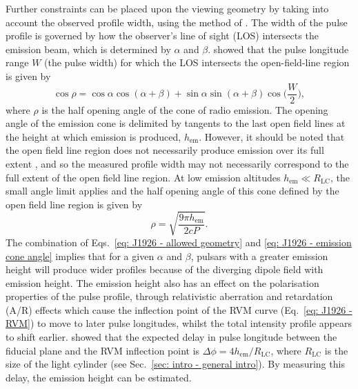 Further constraints can be placed upon the viewing geometry by taking into account the observed profile width, using the method of \citet{RWJx2015a}. The width of the pulse profile is governed by how the observer's line of sight (LOS) intersects the emission beam, which is determined by $\alpha$ and $\beta$. \citet{GGRx1984} showed that the pulse longitude range $W$ (the pulse width) for which the LOS intersects the open-field-line region is given by 
\begin{equation}
    \label{eq: J1926 - allowed geometry}
    \cos\rho = \cos\alpha\cos(\alpha+\beta)+\sin\alpha\sin(\alpha+\beta)\cos\bigg(\frac{W}{2}\bigg),
\end{equation}
where $\rho$ is the half opening angle of the cone of radio emission. The opening angle of the emission cone is delimited by tangents to the last open field lines at the height at which emission is produced, $h_\mathrm{em}$. However, it should be noted that the open field line region does not necessarily produce emission over its full extent \citep[e.g][]{LMxx1988}, and so the measured profile width may not necessarily correspond to the full extent of the open field line region. At low emission altitudes $h_\mathrm{em} \ll R_\mathrm{LC}$, the small angle limit applies \citep[e.g.][]{Gxxx1981,KDxx1983,Rxxx1990} and the half opening angle of this cone defined by the open field line region is given by
\begin{equation}
    \label{eq: J1926 - emission cone angle}
    \rho = \sqrt{\frac{9\pi h_\mathrm{em}}{2cP}}.
\end{equation} 
The combination of Eqs.~\eqref{eq: J1926 - allowed geometry} and \eqref{eq: J1926 - emission cone angle} implies that for a given $\alpha$ and $\beta$, pulsars with a greater emission height will produce wider profiles because of the diverging dipole field with emission height. The emission height also has an effect on the polarisation properties of the pulse profile, through relativistic aberration and retardation (A/R) effects which cause the inflection point of the RVM curve (Eq.~\eqref{eq: J1926 - RVM}) to move to later pulse longitudes, whilst the total intensity profile appears to shift earlier. \citet{BCWx1991} showed that the expected delay in pulse longitude between the fiducial plane and the RVM inflection point is $\Delta\phi = 4h_\mathrm{em}/R_\mathrm{LC}$, where $R_\mathrm{LC}$ is the size of the light cylinder (see Sec.~\ref{sec: intro - general intro}). By measuring this delay, the emission height can be estimated.

